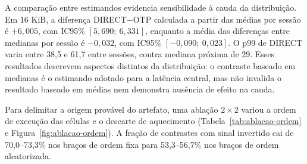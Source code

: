 A comparação entre estimandos evidencia sensibilidade à cauda da distribuição. Em 16 KiB, a diferença DIRECT$-$OTP calculada a partir das médias por sessão é $+6{,}005$\micro{}, com IC95\% $[5{,}690;\ 6{,}331]$, enquanto a média das diferenças entre medianas por sessão é $-0{,}032$\micro{}, com IC95\% $[-0{,}090;\ 0{,}023]$. O p99 de DIRECT varia entre 38,5 e 61,7\micro{} entre sessões, contra mediana próxima de 29\micro{}. Esses resultados descrevem aspectos distintos da distribuição: o contraste baseado em medianas é o estimando adotado para a latência central, mas não invalida o resultado baseado em médias nem demonstra ausência de efeito na cauda.


Para delimitar a origem provável do artefato, uma ablação $2\times2$ variou a ordem de execução das células e o descarte de aquecimento (Tabela~\ref{tab:ablacao-ordem} e Figura~\ref{fig:ablacao-ordem}). A fração de contrastes com sinal invertido cai de 70,0--73,3\% nos braços de ordem fixa para 53,3--56,7\% nos braços de ordem aleatorizada.


